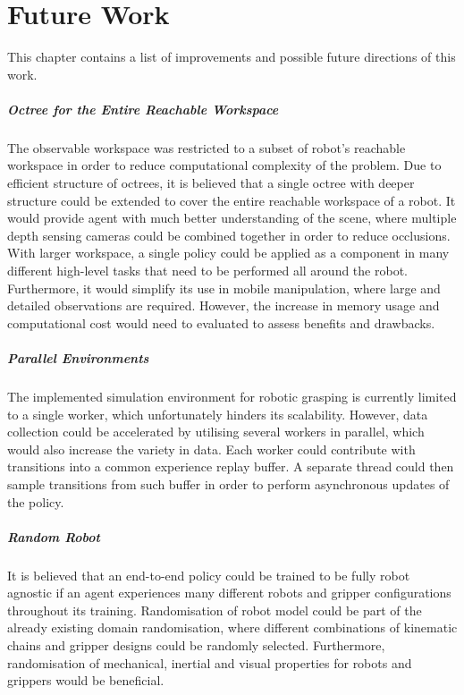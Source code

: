 \chapter{Future Work}\label{ch:future_work}

This chapter contains a list of improvements and possible future directions of this work.

\paragraph{Octree for the Entire Reachable Workspace} The observable workspace was restricted to a subset of robot's reachable workspace in order to reduce computational complexity of the problem. Due to efficient structure of octrees, it is believed that a single octree with deeper structure could be extended to cover the entire reachable workspace of a robot. It would provide agent with much better understanding of the scene, where multiple depth sensing cameras could be combined together in order to reduce occlusions. With larger workspace, a single policy could be applied as a component in many different high-level tasks that need to be performed all around the robot. Furthermore, it would simplify its use in mobile manipulation, where large and detailed observations are required. However, the increase in memory usage and computational cost would need to evaluated to assess benefits and drawbacks.

\paragraph{Parallel Environments} The implemented simulation environment for robotic grasping is currently limited to a single worker, which unfortunately hinders its scalability. However, data collection could be accelerated by utilising several workers in parallel, which would also increase the variety in data. Each worker could contribute with transitions into a common experience replay buffer. A separate thread could then sample transitions from such buffer in order to perform asynchronous updates of the policy.

\paragraph{Random Robot} It is believed that an end-to-end policy could be trained to be fully robot agnostic if an agent experiences many different robots and gripper configurations throughout its training. Randomisation of robot model could be part of the already existing domain randomisation, where different combinations of kinematic chains and gripper designs could be randomly selected. Furthermore, randomisation of mechanical, inertial and visual properties for robots and grippers would be beneficial.

